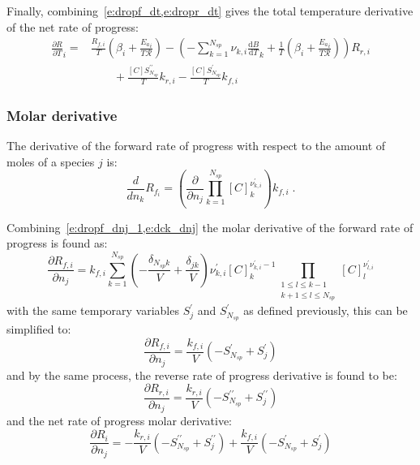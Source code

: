 \documentclass[12pt]{article}
\newcommand{\ns}{N_{sp}}
\newcommand{\Ru}{\mathcal{R}}
\begin{document}
Finally, combining~\cref{e:dropf_dt,e:dropr_dt} gives the total temperature derivative of the net rate of progress:
\begin{align}
 \label{e:drop_dt}
 \frac{\partial R }{\partial T }_{i} =& \frac{{R_{f, i}}}{T} \left(\beta_{i} + \frac{{E_{a}}_{i}}{T \Ru}\right) - \left(- \sum_{k=1}^{\ns} \nu_{k,i} \frac{\text{d} B }{\text{d} T }_{k} + \frac{1}{T} \left(\beta_{i} + \frac{{E_{a}}_{i}}{T \Ru}\right)\right) {R_{r, i}} \nonumber \\
				      &\qquad + \frac{[C] S^{\prime\prime}_{\ns}}{T} {k_{r, i}} - \frac{[C] S^{\prime}_{\ns}}{T} {k_{f, i}}
\end{align}
\subsubsection{Molar derivative}
\label{s:dri_dnj}
The derivative of the forward rate of progress with respect to the amount of moles of a species $j$ is:
\begin{equation}
 \label{e:dropf_dnj_1}
 \frac{d}{d n_{k}} {R_{f_i}} = \left(\frac{\partial}{\partial n_{j}} \prod_{k=1}^{\ns} [C]_{k}^{\nu^{\prime}_{k,i}}\right) {k_{f, i}} \;.
\end{equation}

Combining~\cref{e:dropf_dnj_1,e:dck_dnj} the molar derivative of the forward rate of progress is found as:
\begin{equation}
 \frac{\partial {R_{f, i}} }{\partial {n_j} } = {k_{f, i}} \sum_{k=1}^{\ns} \left(- \frac{\delta_{\ns k}}{V} + \frac{\delta_{j k}}{V}\right) \nu^{\prime}_{k,i} [C]_{k}^{\nu^{\prime}_{k,i} - 1} \prod_{\substack{1 \leq l \leq k - 1\\k + 1 \leq l \leq \ns}} [C]_{l}^{\nu^{\prime}_{l,i}}
\end{equation}
with the same temporary variables $S^{\prime}_{j}$ and $S^{\prime}_{\ns}$ as defined previously, this can be simplified to:
\begin{equation}
 \label{e:dropf_dnj}
 \frac{\partial {R_{f, i}} }{\partial {n_j} } = \frac{{k_{f, i}}}{V} \left(- S^{\prime}_{\ns} + S^{\prime}_{j}\right)
\end{equation}
and by the same process, the reverse rate of progress derivative is found to be:
\begin{equation}
 \label{e:dropr_dnj}
 \frac{\partial {R_{r, i}} }{\partial {n_j} } = \frac{{k_{r, i}}}{V} \left(- S^{\prime\prime}_{\ns} + S^{\prime\prime}_{j}\right)
\end{equation}
and the net rate of progress molar derivative:
\begin{equation}
 \frac{\partial R_{i} }{\partial {n_j} } = - \frac{{k_{r, i}}}{V} \left(- S^{\prime\prime}_{\ns} + S^{\prime\prime}_{j}\right) + \frac{{k_{f, i}}}{V} \left(- S^{\prime}_{\ns} + S^{\prime}_{j}\right)
\end{equation}
\end{document}
